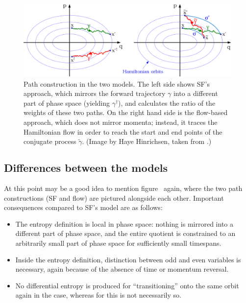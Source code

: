\begin{figure}[htbp]
	\centering
	\includegraphics[width=0.9 \linewidth]{figures/trajectories}
	\caption[]{Path construction in the two models. The left side shows SF's approach, which mirrors the forward trajectory \(\gamma\) into a different part of phase space (yielding \(\gamma^\dagger\)), and calculates the ratio of the weights of these two paths. On the right hand side is the flow-based approach, which does not mirror momenta; instead, it traces the Hamiltonian flow in order to reach the start and end points of the conjugate process \(\tilde\gamma\). (Image by Haye Hinrichsen, taken from \cite{flow-paper}.)}
	\label{fig:hf sf}
\end{figure}

\subsection{Differences between the models}


At this point may be a good idea to mention figure~ again, where the two path constructions (SF and flow) are pictured alongside each other. Important consequences compared to SF's model are as follows:
%
\begin{itemize}
	\item The \HF{} entropy definition is local in phase space: nothing is mirrored into a different part of phase space, and the entire quotient is constrained to an arbitrarily small part of phase space for sufficiently small timespans.
	\item Inside the \HF{} entropy definition, distinction between odd and even variables is necessary, again because of the absence of time or momentum reversal.
	\item No differential entropy is produced for ``transitioning'' onto the same orbit again in the \HF{} case, whereas for \SF{} this is not necessarily so.
\end{itemize}

